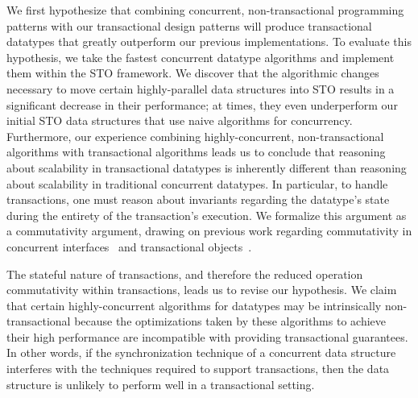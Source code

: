 We first hypothesize that combining concurrent, non-transactional programming patterns with our transactional design patterns will produce transactional datatypes that greatly outperform our previous implementations. To evaluate this hypothesis, we take the fastest concurrent datatype algorithms and implement them within the STO framework. We discover that the algorithmic changes necessary to move certain highly-parallel data structures into STO results in a significant decrease in their performance; at times, they even underperform our initial STO data structures that use naive algorithms for concurrency.
Furthermore, our experience combining highly-concurrent, non-transactional algorithms with transactional algorithms leads us to conclude that reasoning about scalability in transactional datatypes is inherently different than reasoning about scalability in traditional concurrent datatypes. In particular, to handle transactions, one must reason about invariants regarding the datatype's state during the entirety of the transaction's execution. We formalize this argument as a commutativity argument, drawing on previous work regarding commutativity in concurrent interfaces~\cite{scrule} and transactional objects~\cite{schwarz, weihl}.

The stateful nature of transactions, and therefore the reduced operation commutativity within transactions, leads us to revise our hypothesis. 
We claim that certain highly-concurrent algorithms for datatypes may be intrinsically non-transactional because the optimizations taken by these algorithms to achieve their high performance are incompatible with providing transactional guarantees. In other words, if the synchronization technique of a concurrent data structure interferes with the techniques required to support transactions, then the data structure is unlikely to perform well in a transactional setting. 

